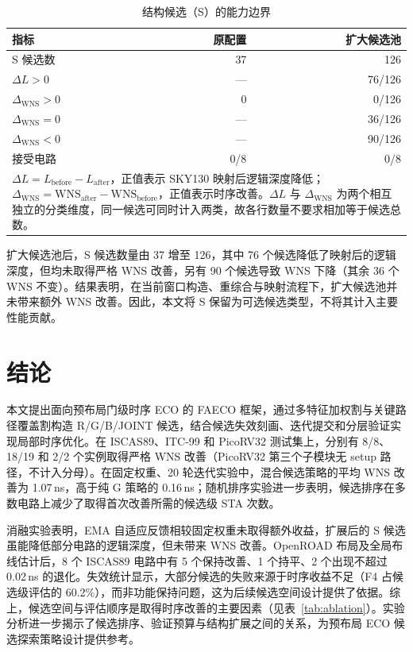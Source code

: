 \documentclass[twocolumn,10pt,fontset=windows]{ctexart}
\begin{document}
\begin{table}[H]
\centering
\caption{结构候选（S）的能力边界}
\label{tab:s_boundary}
\footnotesize
\setlength{\tabcolsep}{8pt}
\begin{tabular}{lrr}
\toprule
\textbf{指标} & \textbf{原配置} & \textbf{扩大候选池} \\
\midrule
S 候选数 & 37 & 126 \\
$\Delta L>0$ & — & 76/126 \\
$\Delta_{\mathrm{WNS}}>0$ & 0 & 0/126 \\
$\Delta_{\mathrm{WNS}}=0$ & — & 36/126 \\
$\Delta_{\mathrm{WNS}}<0$ & — & 90/126 \\
接受电路 & 0/8 & 0/8 \\
\bottomrule
\multicolumn{3}{p{0.9\columnwidth}}{\footnotesize $\Delta L=L_{\mathrm{before}}-L_{\mathrm{after}}$，正值表示 SKY130 映射后逻辑深度降低；$\Delta_{\mathrm{WNS}}=\mathrm{WNS}_{\mathrm{after}}-\mathrm{WNS}_{\mathrm{before}}$，正值表示时序改善。$\Delta L$ 与 $\Delta_{\mathrm{WNS}}$ 为两个相互独立的分类维度，同一候选可同时计入两类，故各行数量不要求相加等于候选总数。}\\
\end{tabular}
\end{table}

扩大候选池后，S 候选数量由 37 增至 126，其中 76 个候选降低了映射后的逻辑深度，但均未取得严格 WNS 改善，另有 90 个候选导致 WNS 下降（其余 36 个 WNS 不变）。结果表明，在当前窗口构造、重综合与映射流程下，扩大候选池并未带来额外 WNS 改善。因此，本文将 S 保留为可选候选类型，不将其计入主要性能贡献。

\section{结论}\label{sec:conclusion}

本文提出面向预布局门级时序 ECO 的 FAECO 框架，通过多特征加权割与关键路径覆盖割构造 R/G/B/JOINT 候选，结合候选失效刻画、迭代提交和分层验证实现局部时序优化。在 ISCAS89、ITC-99 和 PicoRV32 测试集上，分别有 8/8、18/19 和 2/2 个实例取得严格 WNS 改善（PicoRV32 第三个子模块无 setup 路径，不计入分母）。在固定权重、20 轮迭代实验中，混合候选策略的平均 WNS 改善为 1.07\,ns，高于纯 G 策略的 0.16\,ns；随机排序实验进一步表明，候选排序在多数电路上减少了取得首次改善所需的候选级 STA 次数。

消融实验表明，EMA 自适应反馈相较固定权重未取得额外收益，扩展后的 S 候选虽能降低部分电路的逻辑深度，但未带来 WNS 改善。OpenROAD 布局及全局布线估计后，8 个 ISCAS89 电路中有 5 个保持改善、1 个持平、2 个出现不超过 0.02\,ns 的退化。失效统计显示，大部分候选的失败来源于时序收益不足（F4 占候选级评估的 60.2\%），而非功能保持问题，这为后续候选空间设计提供了依据。综上，候选空间与评估顺序是取得时序改善的主要因素（见表~\ref{tab:ablation}）。实验分析进一步揭示了候选排序、验证预算与结构扩展之间的关系，为预布局 ECO 候选探索策略设计提供参考。
\end{document}
